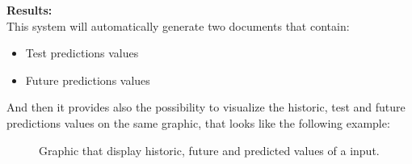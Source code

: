\textbf{Results:}\\
This system will automatically generate two documents that contain:
\vspace{-5mm}
\begin{itemize}
 \setlength{\itemsep}{-5pt} 
\item Test predictions values
\item Future predictions values
\end{itemize}

And then it provides also the possibility to visualize the historic, test and future predictions values on the same graphic, that looks like the following example:

\begin{figure}[H]
    \caption{Graphic that display historic, future and predicted values of a input.}
\end{figure}


\newpage



